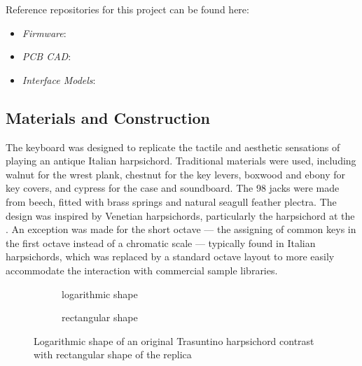 \begin{anonsuppress}
Reference repositories for this project can be found here:

    \begin{itemize}
        \item 
        \emph{Firmware}: 
        \item 
        \emph{PCB CAD}: 
        \item 
        \emph{Interface Models}: 
    \end{itemize}
\end{anonsuppress}

\subsection{Materials and Construction}

The keyboard was designed to replicate the tactile and aesthetic sensations of playing an antique Italian harpsichord. Traditional materials were used, including walnut for the wrest plank, chestnut for the key levers, boxwood and ebony for key covers, and cypress for the case and soundboard. The 98 jacks were made from beech, fitted with brass springs and natural seagull feather plectra. The design was inspired by Venetian harpsichords, particularly the  harpsichord at the . An exception was made for the short octave --- the assigning of common keys in the first octave instead of a chromatic scale --- typically found in Italian harpsichords, which was replaced by a standard octave layout to more easily accommodate the interaction with commercial sample libraries. 

\begin{figure}[!b]
    \centering
     \begin{subfigure}[h]{0.4\linewidth}
        \centering
                    
        \caption{logarithmic shape}    
        \label{fig:log-harp}
    \end{subfigure}

    
    \begin{subfigure}[h]{0.4\linewidth}
        \centering
                
        \caption{rectangular shape}
        \label{fig:rect-harp}
    \end{subfigure}
    \caption{Logarithmic shape of an original Trasuntino harpsichord contrast with rectangular shape of the replica}    
    \Description{}
    \label{fig:log-harp-comp}
\end{figure}

